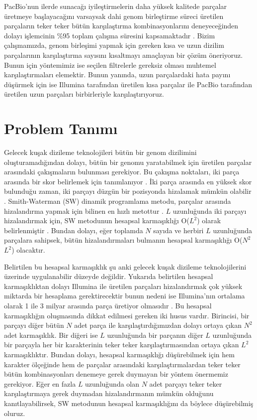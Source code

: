 PacBio'nun ilerde sunacağı iyileştirmelerin daha yüksek kalitede parçalar üretmeye başlayacağını varsaysak dahi genom birleştirme süreci üretilen parçaların teker teker bütün karşılaştırma kombinasyonlarını deneyeceğinden dolayı işlemcinin \%95 toplam çalışma süresini kapsamaktadır \cite{Berlin2015}. Bizim çalışmamızda, genom birleşimi yapmak için gereken kısa ve uzun dizilim parçalarının karşılaştırma sayısını kısaltmayı amaçlayan bir çözüm öneriyoruz. Bunun için yöntemimiz ise seçilen filtrelerle gereksiz olması muhtemel karşılaştırmaları elemektir. Bunun yanında, uzun parçalardaki hata payını düşürmek için ise Illumina tarafından üretilen kısa parçalar ile PacBio tarafından üretilen uzun parçaları birbirleriyle karşılaştırıyoruz.

\section{Problem Tanımı}

Gelecek kuşak dizileme teknolojileri bütün bir genom dizilimini oluşturamadığından dolayı, bütün bir genomu yaratabilmek için üretilen parçalar arasındaki çakışmaların bulunması gerekiyor. Bu çakışma noktaları, iki parça arasında bir skor belirlemek için tanımlanıyor \cite{Staden1980}. İki parça arasında en yüksek skor bulunduğu zaman, iki parçayı düzgün bir pozisyonda hizalamak mümkün olabilir \cite{Staden1980}. Smith-Waterman (SW) dinamik programlama metodu, parçalar arasında hizalandırma yapmak için bilinen en hızlı metottur \cite{Smith1981}. $L$ uzunluğunda iki parçayı hizalandırmak için, SW metodunun hesapsal karmaşıklığı O($L^2$) olarak belirlenmiştir \cite{Smith1981}. Bundan dolayı, eğer toplamda $N$ sayıda ve herbiri $L$ uzunluğunda parçalara sahipsek, bütün hizalandırmaları bulmanın hesapsal karmaşıklığı O($N^2$$L^2$) olacaktır.

Belirtilen bu hesapsal karmaşıklık şu anki gelecek kuşak dizileme teknolojilerini üzerinde uygulanabilir düzeyde değildir. Yukarıda belirtilen hesapsal karmaşıklıktan dolayı Illumina ile üretilen parçaları hizalandırmak çok yüksek miktarda bir hesaplama gerektirecektir bunun nedeni ise Illumina'nın ortalama olarak 1 ile 3 milyar arasında parça üretiyor olmasıdır \cite{Metzker2010}. Bu hesapsal karmaşıklığın oluşmasında dikkat edilmesi gereken iki husus vardır. Birincisi, bir parçayı diğer bütün $N$ adet parça ile karşılaştırdığımızdan dolayı ortaya çıkan $N^2$ adet karmaşıklık. Bir diğeri ise $L$ uzunluğunda bir parçanın diğer $L$ uzunluğunda bir parçayla her bir karakterinin teker teker karşılaştırmasından ortaya çıkan $L^2$ karmaşıklıktır. Bundan dolayı, hesapsal karmaşıklığı düşürebilmek için hem karakter ölçeğinde hem de parçalar arasındaki karşılaştırmalardan teker teker bütün kombinasyonları denemeye gerek duymayan bir yöntem önermemiz gerekiyor. Eğer en fazla $L$ uzunluğunda olan $N$ adet parçayı teker teker karşılaştırmaya gerek duymadan hizalandırmanın mümkün olduğunu kanıtlayabilirsek, SW metodunun hesapsal karmaşıklığını da böylece düşürebilmiş oluruz.

